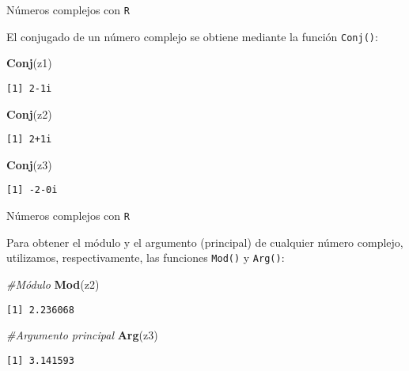 \documentclass[
  ignorenonframetext,
]{beamer}
\newenvironment{Shaded}{\begin{snugshade}}{\end{snugshade}}
\newcommand{\CommentTok}[1]{\textcolor[rgb]{0.56,0.35,0.01}{\textit{#1}}}
\newcommand{\KeywordTok}[1]{\textcolor[rgb]{0.13,0.29,0.53}{\textbf{#1}}}
\newcommand{\NormalTok}[1]{#1}
\begin{document}
\begin{frame}[fragile]{Números complejos con \texttt{R}}
\protect\hypertarget{nuxfameros-complejos-con-r-5}{}

El conjugado de un número complejo se obtiene mediante la función
\texttt{Conj()}:

\begin{Shaded}
\begin{Highlighting}[]
\KeywordTok{Conj}\NormalTok{(z1)}
\end{Highlighting}
\end{Shaded}

\begin{verbatim}
[1] 2-1i
\end{verbatim}

\begin{Shaded}
\begin{Highlighting}[]
\KeywordTok{Conj}\NormalTok{(z2)}
\end{Highlighting}
\end{Shaded}

\begin{verbatim}
[1] 2+1i
\end{verbatim}

\begin{Shaded}
\begin{Highlighting}[]
\KeywordTok{Conj}\NormalTok{(z3)}
\end{Highlighting}
\end{Shaded}

\begin{verbatim}
[1] -2-0i
\end{verbatim}

\end{frame}

\begin{frame}[fragile]{Números complejos con \texttt{R}}
\protect\hypertarget{nuxfameros-complejos-con-r-6}{}

Para obtener el módulo y el argumento (principal) de cualquier número
complejo, utilizamos, respectivamente, las funciones \texttt{Mod()} y
\texttt{Arg()}:

\begin{Shaded}
\begin{Highlighting}[]
\CommentTok{#Módulo}
\KeywordTok{Mod}\NormalTok{(z2)}
\end{Highlighting}
\end{Shaded}

\begin{verbatim}
[1] 2.236068
\end{verbatim}

\begin{Shaded}
\begin{Highlighting}[]
\CommentTok{#Argumento principal}
\KeywordTok{Arg}\NormalTok{(z3)}
\end{Highlighting}
\end{Shaded}

\begin{verbatim}
[1] 3.141593
\end{verbatim}

\end{frame}
\end{document}
